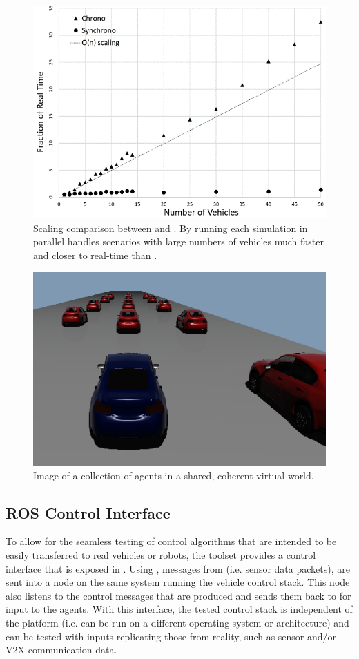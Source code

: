 \begin{figure}
	\centering
	\includegraphics[width=0.8\columnwidth]{Figs/Syn-Chrono-Scaling.png}
	\caption{{\small Scaling comparison between \chrono{} and \synchrono{}. By running each simulation in parallel \synchrono{} handles scenarios with large numbers of vehicles much faster and closer to real-time than \chrono{}.}}   
	\label{fig:synchronoscalingold}
\end{figure}

\begin{figure}
	\centering
	\includegraphics[width=0.8\columnwidth]{Figs/Syn-Platoon.png}
	\caption{{\small Image of a collection of agents in a shared, coherent virtual world.}}   
	\label{fig:synplatoonold}
\end{figure}

\subsection{ROS \chrono{} Control Interface}\label{s:roscontrolinterface}

To allow for the seamless testing of control algorithms that are intended to be easily transferred to real vehicles or robots, the toolset provides a \ros{} control interface that is exposed in \synchrono{}. Using \tcp{}, messages from \synchrono{} (i.e. sensor data packets), are sent into a \ros{} node on the same system running the vehicle control stack. This node also listens to the \ros{} control messages that are produced and sends them back to \synchrono{} for input to the \chrono{} agents. With this \ros{} interface, the tested control stack is independent of the \synchrono{} platform (i.e. can be run on a different operating system or architecture) and can be tested with inputs replicating those from reality, such as sensor and/or V2X communication data.

